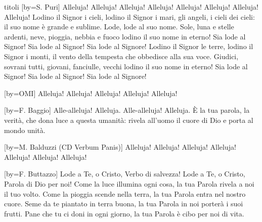 \begin{songs}{titoli}
[by={S. Puri}]
\beginchorus
Alleluja! Alleluja! Alleluja! Alleluja!
Alleluja! Alleluja! Alleluja! Alleluja! 
\endchorus
\beginverse
Lodino il Signor i cieli, lodino il Signor i mari,
gli angeli, i cieli dei cieli: il suo nome è grande e sublime.
Lode, lode al suo nome.
Sole, luna e stelle ardenti, neve, pioggia, nebbia e fuoco
lodino il suo nome in eterno!
Sia lode al Signor! Sia lode al Signor!
Sia lode al Signore!
\endverse
\beginverse
Lodino il Signor le terre, lodino il Signor i monti,
il vento della tempesta che obbedisce alla sua voce.
Giudici, sovrani tutti, giovani, fanciulle, vecchi
lodino il suo nome in eterno!
Sia lode al Signor! Sia lode al Signor!
Sia lode al Signore!
\endverse
\endsong

[by={OMI}]
\beginverse*
Alleluja! Alleluja!
Alleluja! Alleluja! Alleluja! 
\endverse
\endsong

[by={F. Baggio}]
\beginchorus
Alle-alleluja! Alleluja. Alle-alleluja! Alleluja. 
\endchorus
\beginverse
È la tua parola, la verità, che dona luce a questa umanità:
rivela all'uomo il cuore di Dio e porta al mondo unità.
\endverse
\endsong

[by={M. Balduzzi (CD Verbum Panis)}]
\beginchorus
Alleluja! Alleluja! Alleluja! Alleluja! Alleluja! 
\endchorus
\beginverse*
Alleluja! Alleluja! 
\endverse
\endsong

[by={F. Buttazzo}]
\beginchorus
Lode a Te, o Cristo, Verbo di salvezza!
Lode a Te, o Cristo, Parola di Dio per noi! 
\endchorus
\beginverse
Come la luce illumina ogni cosa,
la tua Parola rivela a noi il tuo volto.
Come la pioggia scende nella terra,
la tua Parola entra nel nostro cuore.
\endverse
\beginverse
Seme da te piantato in terra buona,
la tua Parola in noi porterà i suoi frutti.
Pane che tu ci doni in ogni giorno,
la tua Parola è cibo per noi di vita.
\endverse
\endsong


\end{songs}
